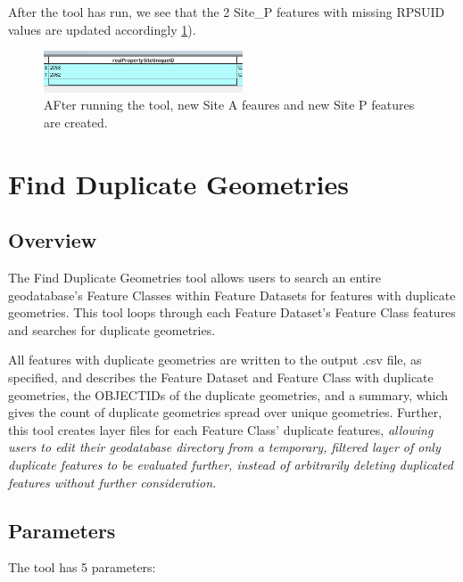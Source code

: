 \documentclass[openany]{book}
\theoremstyle{definition}
\theoremstyle{definition}
\theoremstyle{definition}
\theoremstyle{remark}
\begin{document}
After the tool has run, we see that the 2 Site\_P features with missing
RPSUID values are updated accordingly \ref{fig:sjcafter}).

\begin{figure}[H]

{\centering \includegraphics[width=2.32in,]{figures/spatjoinCalc-after} 

}

\caption{AFter running the tool, new Site A feaures and new Site P features are created.}\label{fig:sjcafter}
\end{figure}

\hypertarget{dupGeom}{\chapter{Find Duplicate
Geometries}\label{dupGeom}}

\section{Overview}\label{overview-4}

The Find Duplicate Geometries tool allows users to search an entire
geodatabase's Feature Classes within Feature Datasets for features with
duplicate geometries. This tool loops through each Feature Dataset's
Feature Class features and searches for duplicate geometries.

All features with duplicate geometries are written to the output .csv
file, as specified, and describes the Feature Dataset and Feature Class
with duplicate geometries, the OBJECTIDs of the duplicate geometries,
and a summary, which gives the count of duplicate geometries spread over
unique geometries. Further, this tool creates layer files for each
Feature Class' duplicate features, \emph{allowing users to edit their
geodatabase directory from a temporary, filtered layer of only duplicate
features to be evaluated further, instead of arbitrarily deleting
duplicated features without further consideration.}

\section{Parameters}\label{parameters-4}

The tool has 5 parameters:
\end{document}
